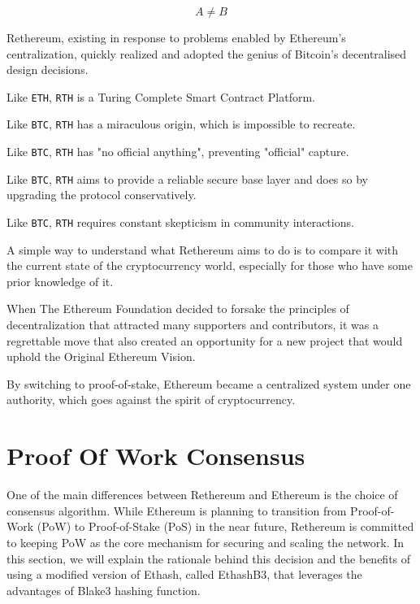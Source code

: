 \documentclass[a4paper,onecolumn, superscriptaddress,10pt,accepted=2020-05-01,issue=1, volume=2, shorttitle=papers]{compositionalityarticle}
\begin{document}
\begin{equation}
  A \neq B
\end{equation}

    Rethereum, existing in response to problems enabled by Ethereum's centralization, quickly realized and adopted the genius of Bitcoin's decentralised design decisions.

\vspace{0.5cm}
    
    Like \texttt{ETH}, \texttt{RTH} is a Turing Complete Smart Contract Platform.
    
    Like \texttt{BTC}, \texttt{RTH} has a miraculous origin, which is impossible to recreate.
    
    Like \texttt{BTC}, \texttt{RTH} has "no official anything", preventing "official" capture.
    
    Like \texttt{BTC}, \texttt{RTH} aims to provide a reliable secure base layer and does so by upgrading the protocol conservatively.
    
    Like \texttt{BTC}, \texttt{RTH} requires constant skepticism in community interactions.
    
\vspace{1cm}

    A simple way to understand what Rethereum aims to do is to compare it with the current state of the cryptocurrency world, especially for those who have some prior knowledge of it.

When The Ethereum Foundation decided to forsake the principles of decentralization that attracted many supporters and contributors, it was a regrettable move that also created an opportunity for a new project that would uphold the Original Ethereum Vision.

By switching to proof-of-stake, Ethereum became a centralized system under one authority, which goes against the spirit of cryptocurrency.

\vspace{1cm}

\section{Proof Of Work Consensus}

One of the main differences between Rethereum and Ethereum is the choice of consensus algorithm. While Ethereum is planning to transition from Proof-of-Work (PoW) to Proof-of-Stake (PoS) in the near future, Rethereum is committed to keeping PoW as the core mechanism for securing and scaling the network. In this section, we will explain the rationale behind this decision and the benefits of using a modified version of Ethash, called EthashB3, that leverages the advantages of Blake3 hashing function.
\end{document}
